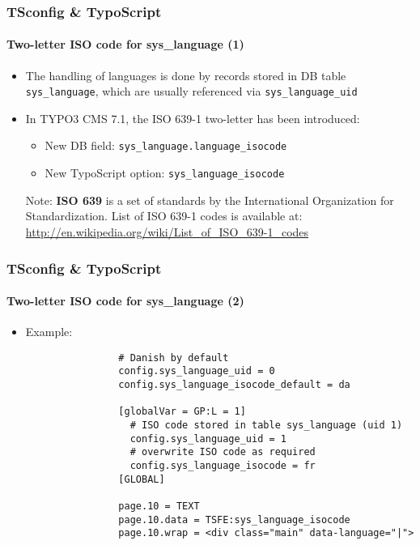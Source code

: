 \begin{frame}[fragile]
	\frametitle{TSconfig \& TypoScript}
	\framesubtitle{Two-letter ISO code for sys\_language (1)}

	\begin{itemize}
		\item The handling of languages is done by records stored in DB table
			\texttt{sys\_language}, which are usually referenced via \texttt{sys\_language\_uid}
		\item In TYPO3 CMS 7.1, the ISO 639-1 two-letter has been introduced:

			\begin{itemize}
				\item New DB field: \texttt{sys\_language.language\_isocode}
				\item New TypoScript option: \texttt{sys\_language\_isocode}
			\end{itemize}


		\vspace{1cm}

		\small
			Note: \textbf{ISO 639} is a set of standards by the International Organization
			for Standardization. List of ISO 639-1 codes is available at:\newline
			\url{http://en.wikipedia.org/wiki/List_of_ISO_639-1_codes}
		\normalsize

	\end{itemize}

\end{frame}


\begin{frame}[fragile]
	\frametitle{TSconfig \& TypoScript}
	\framesubtitle{Two-letter ISO code for sys\_language (2)}

	\begin{itemize}
		\item Example:

			\begin{lstlisting}
				# Danish by default
				config.sys_language_uid = 0
				config.sys_language_isocode_default = da

				[globalVar = GP:L = 1]
				  # ISO code stored in table sys_language (uid 1)
				  config.sys_language_uid = 1
				  # overwrite ISO code as required
				  config.sys_language_isocode = fr
				[GLOBAL]

				page.10 = TEXT
				page.10.data = TSFE:sys_language_isocode
				page.10.wrap = <div class="main" data-language="|">
			\end{lstlisting}

	\end{itemize}

\end{frame}

